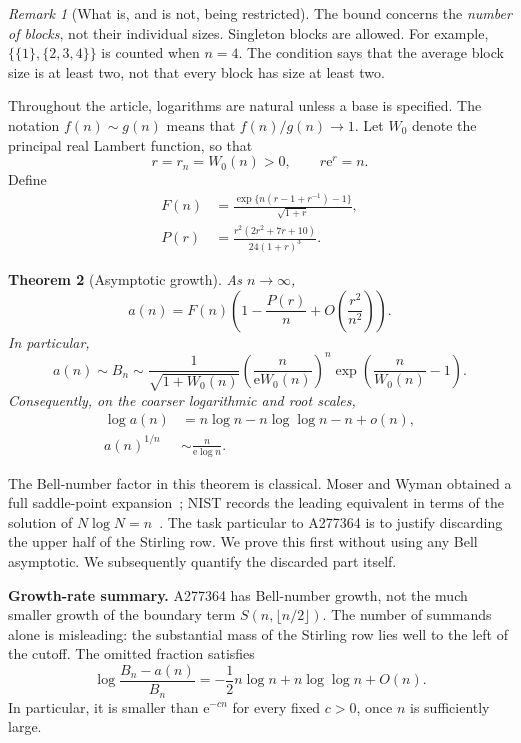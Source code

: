 \documentclass[11pt,a4paper]{article}
\numberwithin{equation}{section}
\newtheorem{theorem}{Theorem}[section]
\theoremstyle{remark}
\newtheorem{remark}[theorem]{Remark}
\newcommand{\e}{\mathrm e}
\begin{document}
\begin{remark}[What is, and is not, being restricted]
The bound concerns the \emph{number of blocks}, not their individual sizes.
Singleton blocks are allowed. For example,
$\{\{1\},\{2,3,4\}\}$ is counted when $n=4$.
The condition says that the average block size is at least two, not that
every block has size at least two.
\end{remark}

Throughout the article, logarithms are natural unless a base is specified.
The notation $f(n)\sim g(n)$ means that $f(n)/g(n)\to1$.
Let $W_0$ denote the principal real Lambert function, so that
\begin{equation}\label{eq:W}
 r=r_n=W_0(n)>0,\qquad r\e^r=n.
\end{equation}
Define
\begin{align}
 F(n)&=\frac{\exp\{n(r-1+r^{-1})-1\}}{\sqrt{1+r}},\label{eq:F}\\
 P(r)&=\frac{r^2(2r^2+7r+10)}{24(1+r)^3}.\label{eq:P}
\end{align}

\begin{theorem}[Asymptotic growth]\label{thm:main}
As $n\to\infty$,
\begin{equation}\label{eq:main}
 a(n)=F(n)\left(1-\frac{P(r)}n+
 O\!\left(\frac{r^2}{n^2}\right)\right).
\end{equation}
In particular,
\begin{equation}\label{eq:equivalent}
 \boxed{\displaystyle
 a(n)\sim B_n\sim
 \frac{1}{\sqrt{1+W_0(n)}}
 \left(\frac{n}{\e W_0(n)}\right)^n
 \exp\!\left(\frac{n}{W_0(n)}-1\right).}
\end{equation}
Consequently, on the coarser logarithmic and root scales,
\begin{align}
 \log a(n)&=n\log n-n\log\log n-n+o(n),\label{eq:logcoarse}\\
 a(n)^{1/n}&\sim\frac{n}{\e\log n}.\label{eq:root}
\end{align}
\end{theorem}

The Bell-number factor in this theorem is classical. Moser and Wyman
obtained a full saddle-point expansion~\cite{moser-wyman}; NIST records the
leading equivalent in terms of the solution of $N\log N=n$~\cite{dlmf-bell}.
The task particular to A277364 is to justify discarding the upper half of
the Stirling row. We prove this first without using any Bell asymptotic.
We subsequently quantify the discarded part itself.

\begin{resultbox}
\textbf{Growth-rate summary.}
A277364 has Bell-number growth, not the much smaller growth of the
boundary term $S(n,\lfloor n/2\rfloor)$. The number of summands alone is
misleading: the substantial mass of the Stirling row lies well to the left
of the cutoff. The omitted fraction satisfies
\[
 \log\frac{B_n-a(n)}{B_n}
 =-\frac12n\log n+n\log\log n+O(n).
\]
In particular, it is smaller than $\e^{-cn}$ for every fixed $c>0$, once
$n$ is sufficiently large.
\end{resultbox}
\end{document}
